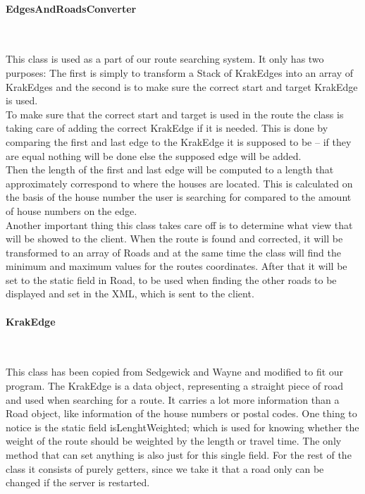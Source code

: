 \documentclass[a4paper,10pt,titlepage]{article}
\begin{document}
				\paragraph{EdgesAndRoadsConverter}\mbox{}\
				
This class is used as a part of our route searching system. It only has two purposes: The first is simply to transform a Stack of KrakEdges into an array of KrakEdges and the second is to make sure the correct start and target KrakEdge is used.\\
To make sure that the correct start and target is used in the route the class is taking care of adding the correct KrakEdge if it is needed. This is done by comparing the first and last edge to the KrakEdge it is supposed to be – if they are equal nothing will be done else the supposed edge will be added.\\
Then the length of the first and last edge will be computed to a length that approximately correspond to where the houses are located. This is calculated on the basis of the house number the user is searching for compared to the amount of house numbers on the edge.\\
Another important thing this class takes care off is to determine what view that will be showed to the client. When the route is found and corrected, it will be transformed to an array of Roads and at the same time the class will find the minimum and maximum values for the routes coordinates. After that it will be set to the static field in Road, to be used when finding the other roads to be displayed and set in the XML, which is sent to the client.\\


				
				\paragraph{KrakEdge \cite{sedgewickAndWayneDirectedEdge}}\mbox{}\
				

This class has been copied from Sedgewick and Wayne and modified to fit our program. The KrakEdge is a data object, representing a straight piece of road and used when searching for a route. It carries a lot more information than a Road object, like information of the house numbers or postal codes. One thing to notice is the static field isLenghtWeighted; which is used for knowing whether the weight of the route should be weighted by the length or travel time. The only method that can set anything is also just for this single field. For the rest of the class it consists of purely getters, since we take it that a road only can be changed if the server is restarted.\\
\end{document}
